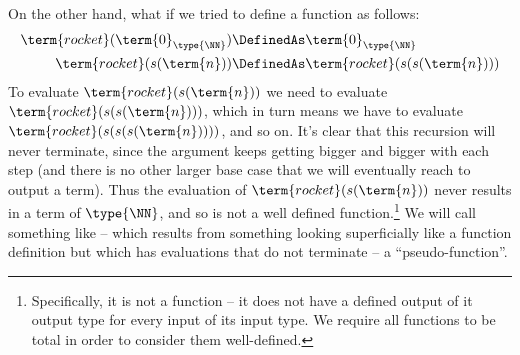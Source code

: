 On the other hand, what if we tried to define a function as follows:
\begin{align*}
\term{rocket}(\term{0}_{\type{\NN}}) &\DefinedAs \term{0}_{\type{\NN}}
\\
\term{rocket}(s(\term{n})) &\DefinedAs
\term{rocket}(s(s(\term{n})))
\end{align*}
To evaluate $\term{rocket}(s(\term{n}))$ we need to evaluate 
$\term{rocket}(s(s(\term{n})))$, which in turn means we have to evaluate
$\term{rocket}(s(s(s(\term{n}))))$, and so on.  It's clear that this recursion will never terminate, since the argument keeps getting bigger and bigger with each step (and there is no other larger base case that we will eventually reach to output a term).  Thus the evaluation of $\term{rocket}(s(\term{n}))$ never results in a term of $\type{\NN}$, and so  is not a well defined function.\footnote{
Specifically, it is not a  function -- it does not have a defined output of it output type for every input of its input type.  We require all functions to be total in order to consider them well-defined.
}
We will call something like  -- which results from something looking superficially like a function definition but which has evaluations that do not terminate -- a ``pseudo-function''.

